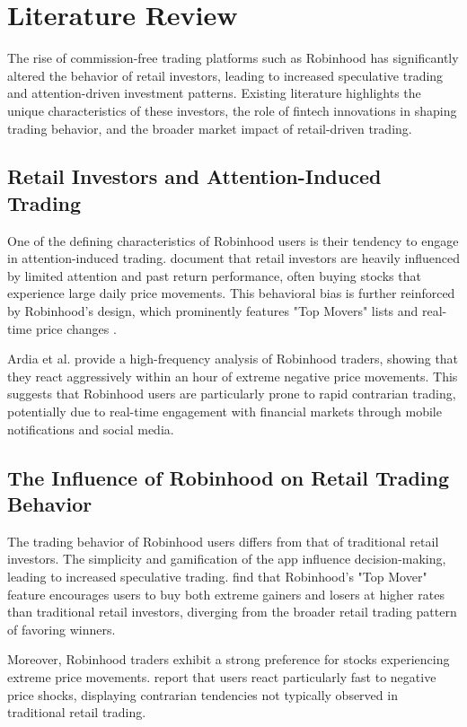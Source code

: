 \section{Literature Review}

The rise of commission-free trading platforms such as Robinhood has significantly altered the behavior of retail investors, leading to increased speculative trading and attention-driven investment patterns. Existing literature highlights the unique characteristics of these investors, the role of fintech innovations in shaping trading behavior, and the broader market impact of retail-driven trading.

\subsection{Retail Investors and Attention-Induced Trading}
One of the defining characteristics of Robinhood users is their tendency to engage in attention-induced trading. \cite{barber2011individual} document that retail investors are heavily influenced by limited attention and past return performance, often buying stocks that experience large daily price movements. This behavioral bias is further reinforced by Robinhood's design, which prominently features "Top Movers" lists and real-time price changes \cite{barber2021robinhood}. 

Ardia et al. \cite{Ardia2023Fast} provide a high-frequency analysis of Robinhood traders, showing that they react aggressively within an hour of extreme negative price movements. This suggests that Robinhood users are particularly prone to rapid contrarian trading, potentially due to real-time engagement with financial markets through mobile notifications and social media.

\subsection{The Influence of Robinhood on Retail Trading Behavior}
The trading behavior of Robinhood users differs from that of traditional retail investors. The simplicity and gamification of the app influence decision-making, leading to increased speculative trading. \cite{barber2021robinhood} find that Robinhood's "Top Mover" feature encourages users to buy both extreme gainers and losers at higher rates than traditional retail investors, diverging from the broader retail trading pattern of favoring winners.

Moreover, Robinhood traders exhibit a strong preference for stocks experiencing extreme price movements. \cite{Ardia2023Fast} report that users react particularly fast to negative price shocks, displaying contrarian tendencies not typically observed in traditional retail trading.

